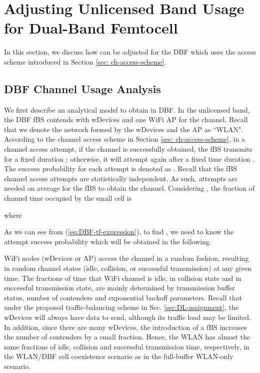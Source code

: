 \documentclass[journal,final,letterpaper,10pt,doublecolumn,twoside]{IEEEtran}
\begin{document}
\section{Adjusting Unlicensed Band Usage for Dual-Band Femtocell}\label{sec_DBF}
In this section, we discuss how  can be adjusted for the DBF which uses the access scheme introduced in Section \ref{sec: ch-access-scheme}.

\subsection{DBF Channel Usage Analysis}\label{subsection-DBF-ch-usage-analysis}

We first describe an analytical model to obtain  in DBF.
In the unlicensed band, the DBF fBS contends with  wDevices and one WiFi AP for the channel. Recall that we denote the network formed by the wDevices and the AP as ``WLAN".
According to the channel access scheme in Section \ref{sec: ch-access-scheme}, in a channel access attempt, if the channel is successfully obtained, the
fBS transmits for a fixed duration ; otherwise,
it will attempt again after a fixed time duration
. The success probability for each attempt is denoted as . Recall that the fBS channel access attempts are
statistically independent. As such, 
attempts are needed on average for the fBS to obtain the channel. Considering , the fraction
of channel time occupied by the small cell is

where

As we can see from (\ref{eq:DBF-tf-expression}), to find , we need to know the attempt success probability  which will be obtained in the following.

WiFi nodes (wDevices or AP) access the channel in a random fashion, resulting in
random channel states (idle, collision, or successful transmission)
at any given time. The fractions of time that WiFi channel is idle,
in collision state and in successful transmission state, are mainly
determined by transmission buffer status, number of contenders and
exponential backoff parameters. Recall that under the proposed
traffic-balancing scheme in Sec. \ref{sec:DL-assignment},  the wDevices
will always have data to send, although its traffic load may be
limited. In addition, since there are many wDevices, the
introduction of a fBS increases the number of contenders by a small
fraction. Hence, the WLAN has almost the same fractions of idle,
collision and successful transmission time, respectively, in the
WLAN/DBF cell coexistence scenario as in the full-buffer WLAN-only
scenario.
\end{document}
